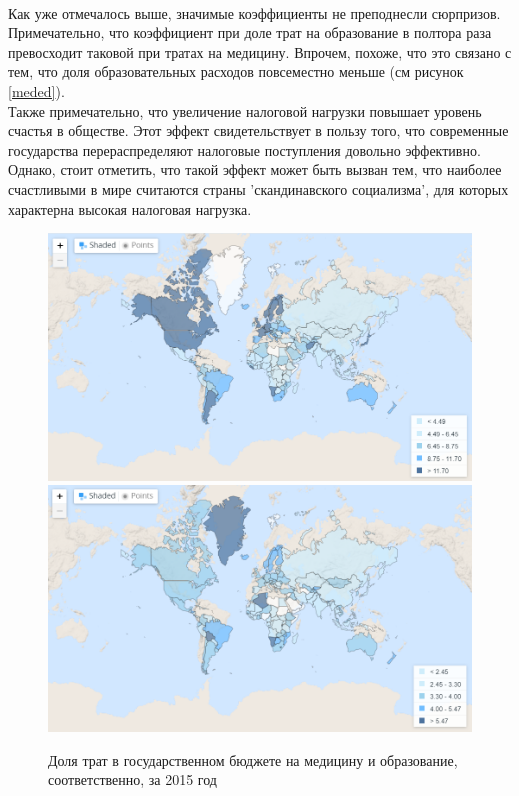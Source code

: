 \documentclass[russian]{vegareport}
\begin{document}
        \\
        Как уже отмечалось выше, значимые коэффициенты не преподнесли сюрпризов. Примечательно, что коэффициент при доле трат на образование в полтора раза превосходит таковой при тратах на медицину. Впрочем, похоже, что это связано с тем, что доля образовательных расходов повсеместно меньше (см рисунок \ref{meded}).
        \\
        Также примечательно, что увеличение налоговой нагрузки повышает уровень счастья в обществе. Этот эффект свидетельствует в пользу того, что современные государства перераспределяют налоговые поступления довольно эффективно. Однако, стоит отметить, что такой эффект может быть вызван тем, что наиболее счастливыми в мире считаются страны 'скандинавского социализма', для которых характерна высокая налоговая нагрузка.

        \begin{figure} \label{meded}
            \centering
            \includegraphics[scale=0.5]{Report/meded1.png}
            \includegraphics[scale=0.5]{Report/meded2.png}
            \caption{Доля трат в государственном бюджете на медицину и образование, соответственно, за 2015 год}
            \label{lect02:pic1}
        \end{figure}
\end{document}
